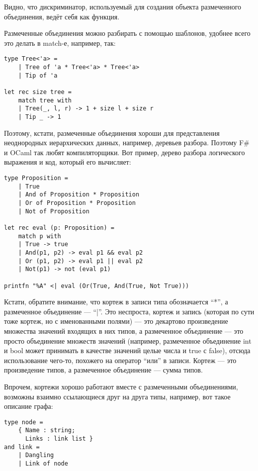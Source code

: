 \documentclass[a5paper]{article}
\begin{document}
Видно, что дискриминатор, используемый для создания объекта размеченного объединения, ведёт себя как функция.

Размеченные объединения можно разбирать с помощью шаблонов, удобнее всего это делать в match-е, например, так:

\begin{verbatim}
type Tree<'a> =
    | Tree of 'a * Tree<'a> * Tree<'a>
    | Tip of 'a

let rec size tree =
    match tree with
    | Tree(_, l, r) -> 1 + size l + size r
    | Tip _ -> 1
\end{verbatim}

Поэтому, кстати, размеченные объединения хороши для представления неоднородных иерархических данных, например, деревьев разбора. Поэтому F\# и OCaml так любят компиляторщики. Вот пример, дерево разбора логического выражения и код, который его вычисляет:

\begin{verbatim}
type Proposition =
    | True
    | And of Proposition * Proposition
    | Or of Proposition * Proposition
    | Not of Proposition

let rec eval (p: Proposition) =
    match p with
    | True -> true
    | And(p1, p2) -> eval p1 && eval p2
    | Or (p1, p2) -> eval p1 || eval p2
    | Not(p1) -> not (eval p1)

printfn "%A" <| eval (Or(True, And(True, Not True)))
\end{verbatim}

Кстати, обратите внимание, что кортеж в записи типа обозначается ``*'', а размеченное объединение --- ``|''. Это неспроста, кортеж и запись (которая по сути тоже кортеж, но с именованными полями) --- это декартово произведение множества значений входящих в них типов, а размеченное объединение --- это просто объединение множеств значений (например, размеченное объединение int и bool может принимать в качестве значений целые числа и true с false), отсюда использование чего-то, похожего на оператор ``или'' в записи. Кортеж --- это произведение типов, а размеченное объединение --- сумма типов.

Впрочем, кортежи хорошо работают вместе с размеченными объединениями, возможны взаимно ссылающиеся друг на друга типы, например, вот такое описание графа:

\begin{verbatim}
type node =
    { Name : string;
      Links : link list }
and link =
    | Dangling
    | Link of node
\end{verbatim}
\end{document}
